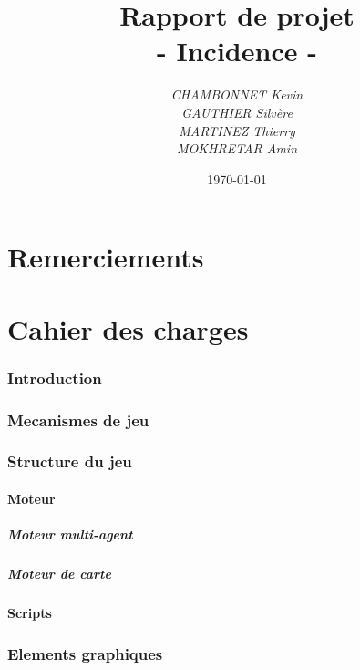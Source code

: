 \documentclass[a4paper]{article}
\title{\textbf{Rapport de projet}\\- \Huge{Incidence} -}
\author{\emph{CHAMBONNET Kevin}\\\emph{GAUTHIER Silvère}\\\emph{MARTINEZ Thierry}\\\emph{MOKHRETAR Amin}}
\date{\today}
\begin{document}
  \maketitle
  \newpage
  \tableofcontents

  \newpage
  \part{Remerciements}

  \newpage
  \part{Cahier des charges}
  
    \section{Introduction}
    
    \section{Mecanismes de jeu}
    
    \section{Structure du jeu}
    
      \subsection{Moteur}
      
        \subsubsection{Moteur multi-agent}
        
        \subsubsection{Moteur de carte}
        
      \subsection{Scripts}
      
    \section{Elements graphiques}
    
\end{document}
